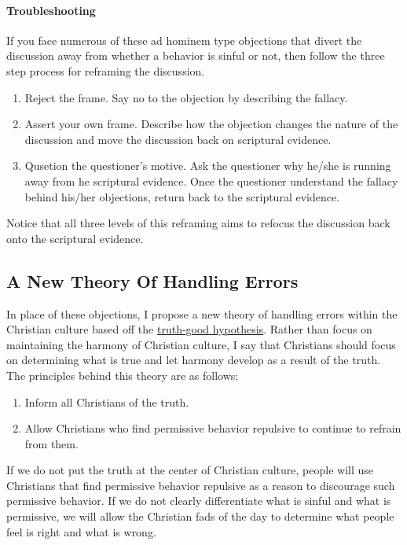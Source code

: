 \documentclass[a4paper, 12pt]{article}
\begin{document}
\paragraph{Troubleshooting} If you face numerous of these ad hominem type objections that divert the discussion away from whether a behavior is sinful or not, then follow the three step process for reframing the discussion. \\
\begin{enumerate}
  \item Reject the frame. Say no to the objection by describing the fallacy.
  \item Assert your own frame. Describe how the objection changes the nature of the discussion and move the discussion back on scriptural evidence.
  \item Qusetion the questioner's motive. Ask the questioner why he/she is running away from he scriptural evidence. Once the questioner understand the fallacy behind his/her objections, return back to the scriptural evidence.
\end{enumerate}
Notice that all three levels of this reframing aims to refocus the discussion back onto the scriptural evidence. \\
\subsection{A New Theory Of Handling Errors}
In place of these objections, I propose a new theory of handling errors within the Christian culture based off the \underline{truth-good hypothesis}. Rather than focus on maintaining the harmony of Christian culture, I say that Christians should focus on determining what is true and let harmony develop as a result of the truth. The principles behind this theory are as follows: \\
\begin{enumerate}
  \item Inform all Christians of the truth.
  \item Allow Christians who find permissive behavior repulsive to continue to refrain from them.
\end{enumerate}
If we do not put the truth at the center of Christian culture, people will use Christians that find permissive behavior repulsive as a reason to discourage such permissive behavior. If we do not clearly differentiate what is sinful and what is permissive, we will allow the Christian fads of the day to determine what people feel is right and what is wrong. \\
\end{document}
